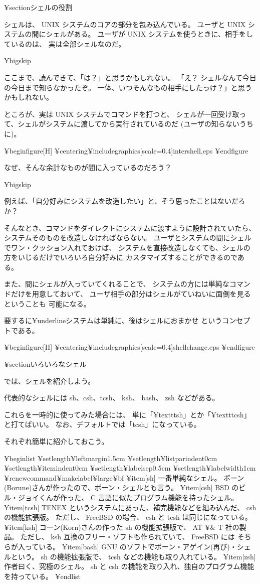¥section{シェルの役割}

シェルは、 UNIX システムのコアの部分を包み込んでいる。
ユーザと UNIX システムの間にシェルがある。
ユーザが UNIX システムを使うときに、相手をしているのは、
実は全部シェルなのだ。

¥bigskip

ここまで、読んできて、「は？」と思うかもしれない。
「え？ シェルなんて今日の今日まで知らなかったぞ。
一体、いつそんなもの相手にしたっけ？」と思うかもしれない。

ところが、実は UNIX システムでコマンドを打つと、
シェルが一回受け取って、シェルがシステムに渡してから実行されているのだ
(ユーザの知らないうちに)。

¥begin{figure}[H]
¥centering{¥includegraphics[scale=0.4]{intershell.eps}}
¥end{figure}

なぜ、そんな余計なものが間に入っているのだろう？

¥bigskip

例えば、「自分好みにシステムを改造したい」と、そう思ったことはないだろか？

そんなとき、コマンドをダイレクトにシステムに渡すように設計されていたら、
システムそのものを改造しなければならない。
ユーザとシステムの間にシェルでワン・クッション入れておけば、
システムを直接改造しなくても、シェルの方をいじるだけでいろいろ自分好みに
カスタマイズすることができるのである。

また、間にシェルが入っていてくれることで、
システムの方には単純なコマンドだけを用意しておいて、
ユーザ相手の部分はシェルがていねいに面倒を見るということも
可能になる。

要するに¥underline{システムは単純に、後はシェルにおまかせ}
というコンセプトである。

¥begin{figure}[H]
¥centering{¥includegraphics[scale=0.4]{shellchange.eps}}
¥end{figure}

¥section{いろいろなシェル}

では、シェルを紹介しよう。

代表的なシェルには sh、csh、tcsh、 ksh、 bash、 zsh などがある。

これらを一時的に使ってみた場合には、
単に「¥texttt{sh}」とか「¥texttt{csh}」と打てばいい。
なお、デフォルトでは「tcsh」になっている。

それぞれ簡単に紹介しておこう。

¥begin{list}{}{
¥setlength{¥leftmargin}{1.5cm}
¥setlength{¥listparindent}{0cm}
¥setlength{¥itemindent}{0cm}
¥setlength{¥labelsep}{0.5cm}
¥setlength{¥labelwidth}{1cm}
}
¥renewcommand{¥makelabel}{¥large¥bf}
¥item[sh] 一番単純なシェル。
ボーン(Borune)さんが作ったので、ボーン・シェルとも言う。
¥item[csh] BSD のビル・ジョイくんが作った、
 C 言語に似たプログラム機能を持ったシェル。
¥item[tcsh] TENEX というシステムにあった、補完機能などを組み込んだ、
csh の機能拡張版。
ただし、 FreeBSD の場合、 csh と tcsh は同じになっている。
¥item[ksh] コーン(Korn)さんの作った sh の機能拡張版で、
 AT ¥& T 社の製品。
ただし、 ksh 互換のフリー・ソフトも作られていて、 FreeBSD には
そちらが入っている。
¥item[bash] GNU のソフトでボーン・アゲイン(再び)・シェルという。
 sh の機能拡張版で、 tcsh などの機能も取り入れている。
¥item[zsh] 作者曰く、究極のシェル。
sh と csh の機能を取り入れ、独自のプログラム機能を持っている。
¥end{list}

